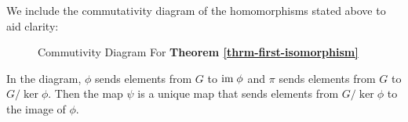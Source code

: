 We include the commutativity diagram of the homomorphisms stated above to aid clarity:

\begin{figure}[h]
    \centering
    \caption{Commutivity Diagram For \textbf{Theorem \ref{thrm-first-isomorphism}}}
\end{figure}

In the diagram, $\phi$ sends elements from $G$ to $\mathrm{im}\;\phi$ and $\pi$ sends elements from $G$ to $G/\ker\phi$. Then the map $\psi$ is a unique map that sends elements from $G/\ker\phi$ to the image of $\phi$.

